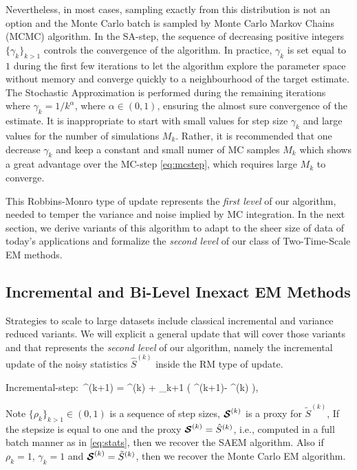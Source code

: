 \documentclass[11pt]{article}
\theoremstyle{t}
\begin{document}
Nevertheless, in most cases, sampling exactly from this distribution is not an option and the Monte Carlo batch is sampled by Monte Carlo Markov Chains (MCMC) algorithm.
In the \textsf{SA-step}, the sequence of decreasing positive integers $\{ \gamma_{k} \}_{k>1}$ controls the convergence of the algorithm.
 In practice, $\gamma_k$ is set equal to $1$ during the first few iterations to let the algorithm explore the parameter space without memory and converge quickly to a neighbourhood of the target estimate. 
 The Stochastic Approximation is performed during the remaining iterations where $\gamma_k = 1/k^\alpha$, where $\alpha \in (0,1)$, ensuring the almost sure convergence of the estimate.
 It is inappropriate to start with small values for step size $\gamma_k$ and large values for the number of simulations $M_k$. Rather, it is recommended that one decrease $\gamma_k$ and keep a constant and small numer of MC samples $M_k$ which shows a great advantage over the \textsf{MC-step} \eqref{eq:mcstep}, which requires large $M_k$ to converge.



This Robbins-Monro type of update represents the \textit{first level} of our algorithm, needed to temper the variance and noise implied by MC integration.
In the next section, we derive variants of this algorithm to adapt to the sheer size of data of today's applications and formalize the \textit{second level} of our class of Two-Time-Scale EM methods.

\subsection{Incremental and Bi-Level Inexact EM Methods} \label{sec:sEM}
Strategies to scale to large datasets include classical incremental and variance reduced variants.
We will explicit a general update that will cover those variants and that represents the \textit{second level} of our algorithm, namely the incremental update of the noisy statistics $\hat{S}^{(k)}$ inside the RM type of update.

\beq \label{eq:sestep}
\textsf{Incremental-step}:~^{(k+1)} = ^{(k)} + \rho_{k+1} \big( \StocEstep^{(k+1)}- ^{(k)}  \big),
\eeq

Note $\{ \rho_{k} \}_{k>1} \in (0,1)$ is a sequence of step sizes, ${\bm{\mathcal{S}}}^{(k)}$ is a proxy for $\tilde{S}^{(k)}$,
If the stepsize is equal to one and the proxy ${\bm{\mathcal{S}}}^{(k)} = \hat{S}^{(k)}$, i.e., computed in a full batch manner as in \eqref{eq:stats}, then we recover the SAEM algorithm.
Also if $\rho_{k}=1$, $\gamma_{k}=1$ and ${\bm{\mathcal{S}}}^{(k)} = \tilde{S}^{(k)}$, then we recover the Monte Carlo EM algorithm.
\end{document}
